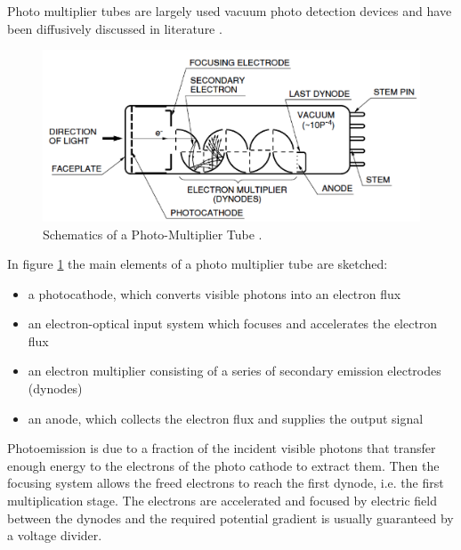 Photo multiplier tubes are largely used vacuum photo detection devices and have been diffusively discussed in literature \cite{Knoll2000}. 
\begin{figure}[htbp]
\begin{center}
\includegraphics[width=12cm]{../Pictures/Chapter_3/PMT.png}
\end{center}
\caption[PMT schematics]{Schematics of a Photo-Multiplier Tube \cite{Hama2006}.}
\label{fig:PMT_schematics}
\end{figure}
In figure \ref{fig:PMT_schematics} the main elements of a photo multiplier tube are sketched:
\begin{itemize}
\item a photocathode, which converts visible photons into an electron flux
\item an electron-optical input system which focuses and accelerates the electron flux
\item an electron multiplier consisting of a series of secondary emission electrodes (dynodes)
\item an anode, which collects the electron flux and supplies the output signal
\end{itemize}
Photoemission is due to a fraction of the incident visible photons that transfer enough energy to the electrons of the photo cathode to extract them.
Then the focusing system allows the freed electrons to reach the first dynode, i.e. the first multiplication stage. The electrons are accelerated and focused by electric field between the dynodes and the required potential gradient is usually guaranteed by a voltage divider.


